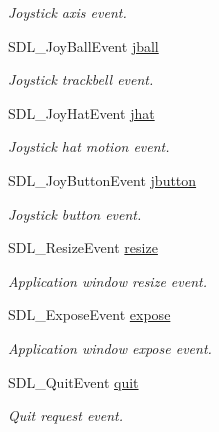 \begin{DoxyCompactItemize}
\begin{DoxyCompactList}\small\item\em Joystick axis event. \item\end{DoxyCompactList}\item 
SDL\_\-JoyBallEvent \hyperlink{struct_tao_1_1_sdl_1_1_s_d_l___event_a97ae230b63c80c1e12dc7ce6d3b1048f}{jball}
\begin{DoxyCompactList}\small\item\em Joystick trackbell event. \item\end{DoxyCompactList}\item 
SDL\_\-JoyHatEvent \hyperlink{struct_tao_1_1_sdl_1_1_s_d_l___event_a66d412f4b5a22e1a2a6c2f095bd8ff77}{jhat}
\begin{DoxyCompactList}\small\item\em Joystick hat motion event. \item\end{DoxyCompactList}\item 
SDL\_\-JoyButtonEvent \hyperlink{struct_tao_1_1_sdl_1_1_s_d_l___event_a525a01d671ad3cbf9750ad52be47f251}{jbutton}
\begin{DoxyCompactList}\small\item\em Joystick button event. \item\end{DoxyCompactList}\item 
SDL\_\-ResizeEvent \hyperlink{struct_tao_1_1_sdl_1_1_s_d_l___event_abffabebcebe15c4c55dc18509a31292b}{resize}
\begin{DoxyCompactList}\small\item\em Application window resize event. \item\end{DoxyCompactList}\item 
SDL\_\-ExposeEvent \hyperlink{struct_tao_1_1_sdl_1_1_s_d_l___event_a724b34721ac3b2d54f99e426c8c1a204}{expose}
\begin{DoxyCompactList}\small\item\em Application window expose event. \item\end{DoxyCompactList}\item 
SDL\_\-QuitEvent \hyperlink{struct_tao_1_1_sdl_1_1_s_d_l___event_a1c8931bbb660f0466e3abbf710e70fee}{quit}
\begin{DoxyCompactList}\small\item\em Quit request event. \item\end{DoxyCompactList}\item 

\end{DoxyCompactItemize}
